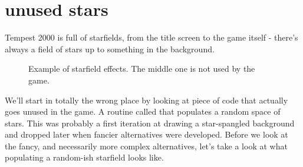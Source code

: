 \chapter{unused stars}
\lhead[tempest 2000]{}
\label{sec:listing}
\lstset{style=68KStyle}

Tempest 2000 is full of starfields, from the title screen to the game itself - there's always a field of stars up to something in the background.

\begin{figure}[H]
    \centering
    \begin{adjustbox}{width=12cm,center}
      \hspace{0.5cm}
      \hspace{0.5cm}
    \end{adjustbox}
  \caption{Example of starfield effects. The middle one is not used by the game.}
\end{figure}

We'll start in totally the wrong place by looking at piece of code that actually goes unused in the game. A routine called
 that populates a random space of stars. This was probably a first iteration at drawing a star-spangled
background and dropped later when fancier alternatives were developed. Before we look at the fancy, and necessarily more complex
alternatives, let's take a look at what populating a random-ish starfield looks like.

